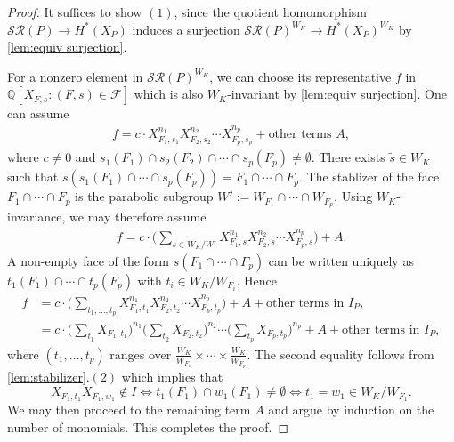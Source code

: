 \documentclass[10pt,a4paper]{amsart}
\newcommand{\Q}{\mathbb{Q}}
\begin{document}
\begin{proof}
  It suffices to show $(1)$, since the  quotient homomorphism $\mathcal{SR}(P)\to H^*(X_{P})$ induces a surjection $\mathcal{SR}(P)^{W_K}\to H^*(X_{P})^{W_K}$ by \cref{lem:equiv surjection}.

For a nonzero element in $\mathcal{SR}(P)^{W_K}$, we can choose its representative $f$ in 
$\Q[X_{F,s}: (F,s)\in\mathcal{F}]$ which is also $W_K$-invariant by \cref{lem:equiv surjection}. 
One can assume 
\begin{align*} 
  f= c\cdot X_{F_1,s_1}^{n_1}X_{F_2,s_2}^{n_2}\cdots X_{F_p,s_p}^{n_p}+\text{other terms $A$}, 
\end{align*} 
where $c\neq 0$ and $s_1(F_{1})\cap s_2(F_{2})\cap\cdots \cap s_p(F_{p})\ne \emptyset$. 
There exists  $\tilde{s}\in W_K$ such that 
$\tilde{s}\left(s_1(F_{1})\cap\cdots \cap s_p(F_{p})\right)=F_{1}\cap\cdots\cap F_{p}$. 
The stablizer of the face $F_{1}\cap\cdots\cap F_{p}$ is the parabolic subgroup $W':=W_{F_1}\cap\cdots\cap W_{F_p}$.
Using $W_K$-invariance, we may therefore assume 
\begin{align*} 
  f= c\cdot\biggl(\sum_{s\in {W_K}/{W'}} X_{F_1,s}^{n_1}X_{F_2,s}^{n_2}\cdots X_{F_p,s}^{n_p}\biggr)+A. 
\end{align*}
A non-empty face of the form $s(F_1\cap \cdots \cap F_p)$ can be written uniquely as
$t_1(F_{1})\cap\cdots \cap t_p(F_{p})$ with $t_i\in W_K/W_{F_i}$.
Hence
\begin{align*} 
  f&= c\cdot\biggl(\sum_{t_1,\ldots,t_{p}} X_{F_1,t_1}^{n_1}X_{F_2,t_2}^{n_2}\cdots X_{F_p,t_p}^{n_p}\biggr)+A+\mbox{other terms in $I_P$},\\ &=c\cdot\biggl(\sum_{t_1} X_{F_1,t_1}\biggr)^{n_1}\biggl(\sum_{t_2} X_{F_2,t_2}\biggr)^{n_2}\cdots \biggl(\sum_{t_p} X_{F_p,t_p}\biggr)^{n_p}+A+\mbox{other terms in $I_P$}, 
\end{align*} 
where $(t_1,\ldots,t_p)$ ranges over $\frac{W_K}{W_{F_1}}\times\cdots\times\frac{W_K}{W_{F_p}}$.
 The second equality follows from \cref{lem:stabilizer}.$(2)$ which implies that 
 $$X_{F_1,t_1}X_{F_1,w_1}\notin I\Leftrightarrow t_1(F_{1})\cap w_1(F_{1})\ne\emptyset\Leftrightarrow t_1=w_1\in {W_K}/{W_{F_1}}.$$ 
We may then proceed to the remaining term $A$ and argue by induction on the number of monomials.
This completes the proof.
\end{proof}
\end{document}
